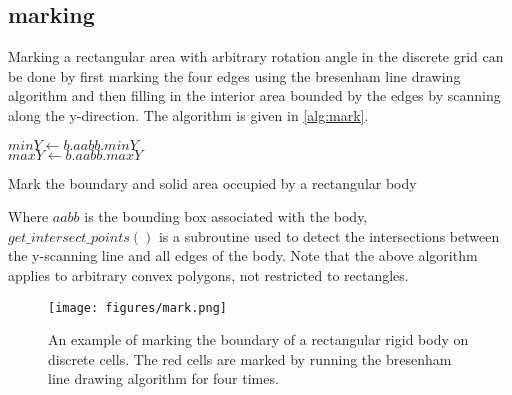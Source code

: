 \subsection{marking}
Marking a rectangular area with arbitrary rotation angle in the discrete grid can be done by first marking the four edges using the bresenham line drawing algorithm \cite{bresenham} and then filling in the interior area bounded by the edges by scanning along the y-direction. The algorithm is given in \autoref{alg:mark}.
\begin{algorithm}[htbp]
    \SetAlgoLined
    
    $minY \leftarrow b.aabb.minY$\\
    $maxY \leftarrow b.aabb.maxY$\\
        \caption{Mark the boundary and solid area occupied by a rectangular body}\label{alg:mark}
\end{algorithm}
Where $aabb$ is the bounding box associated with the body, $get\_intersect\_points()$ is a subroutine used to detect the intersections between the y-scanning line and all edges of the body. Note that the above algorithm applies to arbitrary convex polygons, not restricted to rectangles.
\begin{figure}[H]
\centering
  \texttt{[image: figures/mark.png]}
  \caption{An example of marking the boundary of a rectangular rigid body on discrete cells. The red cells are marked by running the bresenham line drawing algorithm for four times.}
  \label{fig:mark}
\end{figure}

